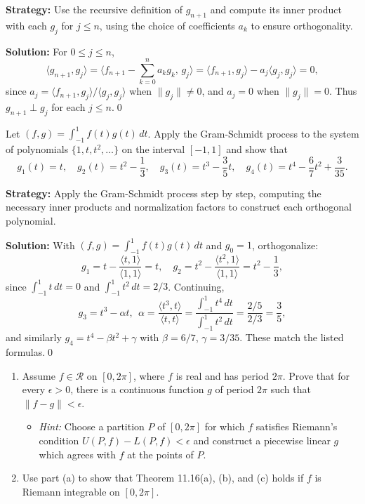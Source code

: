 \noindent\textbf{Strategy:} Use the recursive definition of $g_{n+1}$ and compute its inner product with each $g_j$ for $j \leq n$, using the choice of coefficients $a_k$ to ensure orthogonality.

\bigskip\noindent\textbf{Solution:}
For $0\le j\le n$,
\[
\langle g_{n+1}, g_j\rangle = \Big\langle f_{n+1} - \sum_{k=0}^n a_k g_k,\, g_j\Big\rangle = \langle f_{n+1}, g_j\rangle - a_j\langle g_j, g_j\rangle = 0,
\]
since $a_j = \langle f_{n+1}, g_j\rangle/\langle g_j, g_j\rangle$ when $\|g_j\|\neq 0$, and $a_j=0$ when $\|g_j\|=0$. Thus $g_{n+1}\perp g_j$ for each $j\le n$.\qed


\begin{problembox}
\begin{problemstatement}
Let $(f, g) = \int_{-1}^1 f(t)g(t) \, dt$. Apply the Gram-Schmidt process to the system of polynomials $\{1, t, t^2, \dots\}$ on the interval $[-1, 1]$ and show that
\[
g_1(t) = t, \quad g_2(t) = t^2 - \frac{1}{3}, \quad g_3(t) = t^3 - \frac{3}{5}t, \quad g_4(t) = t^4 - \frac{6}{7}t^2 + \frac{3}{35}.
\]
\end{problemstatement}
\end{problembox}

\noindent\textbf{Strategy:} Apply the Gram-Schmidt process step by step, computing the necessary inner products and normalization factors to construct each orthogonal polynomial.

\bigskip\noindent\textbf{Solution:}
With $(f,g)=\int_{-1}^1 f(t)g(t)\,dt$ and $g_0=1$, orthogonalize:
\[
g_1 = t - \frac{\langle t,1\rangle}{\langle 1,1\rangle} = t,\quad
g_2 = t^2 - \frac{\langle t^2,1\rangle}{\langle 1,1\rangle} = t^2 - \frac{1}{3},
\]
since $\int_{-1}^1 t\,dt=0$ and $\int_{-1}^1 t^2\,dt=2/3$. Continuing,
\[
g_3 = t^3 - \alpha t,\ \ \alpha = \frac{\langle t^3, t\rangle}{\langle t,t\rangle} = \frac{\int_{-1}^1 t^4\,dt}{\int_{-1}^1 t^2\,dt} = \frac{2/5}{2/3} = \frac{3}{5},
\]
and similarly $g_4 = t^4 - \beta t^2 + \gamma$ with $\beta=6/7$, $\gamma=3/35$. These match the listed formulas.\qed


\begin{problembox}
\begin{problemstatement}
\begin{enumerate}[label=(\alph*)]
\item Assume $f \in \mathcal{R}$ on $[0, 2\pi]$, where $f$ is real and has period $2\pi$. Prove that for every $\epsilon > 0$, there is a continuous function $g$ of period $2\pi$ such that $\|f - g\| < \epsilon$.
\begin{itemize}
\item \textit{Hint:} Choose a partition $P$ of $[0, 2\pi]$ for which $f$ satisfies Riemann's condition $U(P, f) - L(P, f) < \epsilon$ and construct a piecewise linear $g$ which agrees with $f$ at the points of $P$.
\end{itemize}
\item Use part (a) to show that Theorem 11.16(a), (b), and (c) holds if $f$ is Riemann integrable on $[0, 2\pi]$.
\end{enumerate}
\end{problemstatement}
\end{problembox}

